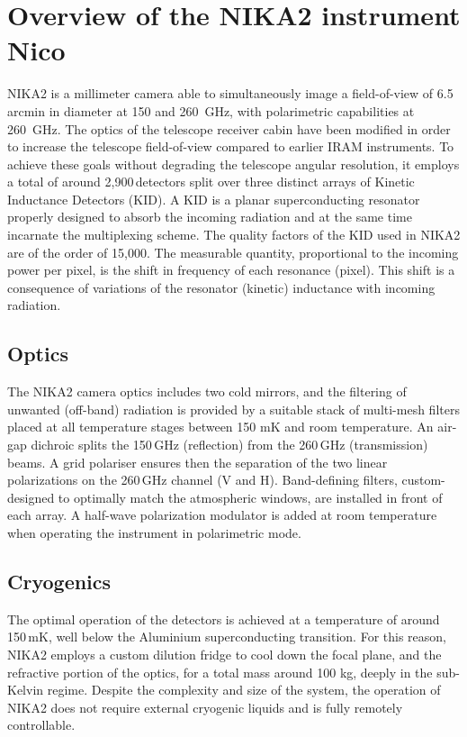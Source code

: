 
\section{Overview of the NIKA2 instrument {\color{YellowGreen} Nico}}

NIKA2 is a millimeter camera able to simultaneously image a field-of-view of
6.5\,arcmin in diameter at 150 and 260~GHz, with polarimetric capabilities at
260~GHz. The optics of the telescope receiver cabin have been modified in order
to increase the telescope field-of-view compared to earlier IRAM instruments. To
achieve these goals without degrading the telescope angular resolution, it
employs a total of around 2,900\,detectors split over three distinct arrays of
Kinetic Inductance Detectors (KID). A KID is a planar superconducting resonator
properly designed to absorb the incoming radiation and at the same time
incarnate the multiplexing scheme. The quality factors of the KID used in NIKA2
are of the order of 15,000. The measurable quantity, proportional to the
incoming power per pixel, is the shift in frequency of each resonance
(pixel). This shift is a consequence of variations of the resonator (kinetic)
inductance with incoming radiation.

\subsection{Optics}

The NIKA2 camera optics includes two cold mirrors, and the filtering of unwanted
(off-band) radiation is provided by a suitable stack of multi-mesh filters
placed at all temperature stages between 150 mK and room temperature. An air-gap
dichroic splits the 150\,GHz (reflection) from the 260\,GHz (transmission)
beams. A grid polariser ensures then the separation of the two linear
polarizations on the 260\,GHz channel (V and H). Band-defining filters,
custom-designed to optimally match the atmospheric windows, are installed in
front of each array. A half-wave polarization modulator is added at room
temperature when operating the instrument in polarimetric mode.



\subsection{Cryogenics}

The optimal operation of the detectors is achieved at a temperature of around
150\,mK, well below the Aluminium superconducting transition. For this reason,
NIKA2 employs a custom dilution fridge to cool down the focal plane, and the
refractive portion of the optics, for a total mass around 100 kg, deeply in the
sub-Kelvin regime. Despite the complexity and size of the system, the operation
of NIKA2 does not require external cryogenic liquids and is fully remotely
controllable.

